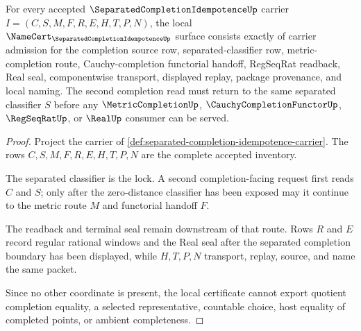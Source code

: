 \begin{theorem}
\label{thm:separated-completion-idempotence-namecert-obligations}
For every accepted $\SeparatedCompletionIdempotenceUp$ carrier $I=(C,S,M,F,R,E,H,T,P,N)$, the local $\NameCert_{\SeparatedCompletionIdempotenceUp}$ surface consists exactly of carrier admission for the completion source row, separated-classifier row, metric-completion route, Cauchy-completion functorial handoff, RegSeqRat readback, Real seal, componentwise transport, displayed replay, package provenance, and local naming. The second completion read must return to the same separated classifier $S$ before any $\MetricCompletionUp$, $\CauchyCompletionFunctorUp$, $\RegSeqRatUp$, or $\RealUp$ consumer can be served.
\end{theorem}
\begin{proof}
Project the carrier of \autoref{def:separated-completion-idempotence-carrier}. The rows $C,S,M,F,R,E,H,T,P,N$ are the complete accepted inventory.

The separated classifier is the lock. A second completion-facing request first reads $C$ and $S$; only after the zero-distance classifier has been exposed may it continue to the metric route $M$ and functorial handoff $F$.

The readback and terminal seal remain downstream of that route. Rows $R$ and $E$ record regular rational windows and the Real seal after the separated completion boundary has been displayed, while $H,T,P,N$ transport, replay, source, and name the same packet.

Since no other coordinate is present, the local certificate cannot export quotient completion equality, a selected representative, countable choice, host equality of completed points, or ambient completeness.
\end{proof}

